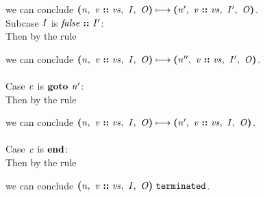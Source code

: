 \documentclass[12pt]{article}
\begin{document}
we can conclude
$\steps{
   \cfg{\nterm{n}}{\cons{\nterm{v}}{\nterm{vs}}}{\nterm{I}}{\nterm{O}}
 }{
   \cfg{\nterm{n'}}{\cons{\nterm{v}}{\nterm{vs}}}{\nterm{I'}}{\nterm{O}}
 }$.\\

Subcase $\nterm{I}$ is $\cons{\nterm{false}}{\nterm{I'}}$:\\

Then by the rule

\begin{mathpar}
\end{mathpar}

we can conclude
$\steps{
   \cfg{\nterm{n}}{\cons{\nterm{v}}{\nterm{vs}}}{\nterm{I}}{\nterm{O}}
 }{
   \cfg{\nterm{n''}}{\cons{\nterm{v}}{\nterm{vs}}}{\nterm{I'}}{\nterm{O}}
 }$.\\
\\

Case $\nterm{c}$ is $\goto{\nterm{n'}}$:\\

Then by the rule

\begin{mathpar}
\end{mathpar}

we can conclude
$\steps{
   \cfg{\nterm{n}}{\cons{\nterm{v}}{\nterm{vs}}}{\nterm{I}}{\nterm{O}}
 }{
   \cfg{\nterm{n'}}{\cons{\nterm{v}}{\nterm{vs}}}{\nterm{I}}{\nterm{O}}
 }$.\\
\\

Case $\nterm{c}$ is $\progend$:\\

Then by the rule

\begin{mathpar}
\end{mathpar}

we can conclude
$\terminated{\cfg{\nterm{n}}{\cons{\nterm{v}}{\nterm{vs}}}{\nterm{I}}{\nterm{O}}}$.
\end{document}
